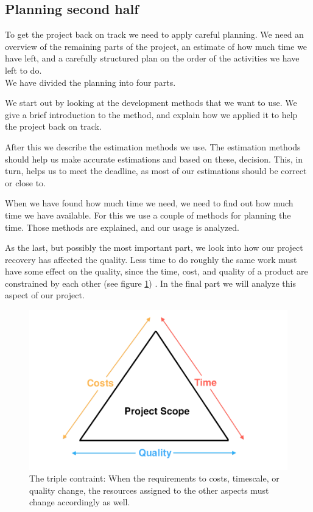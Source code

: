 \subsection{Planning second half}
To get the project back on track we need to apply careful planning. We need an overview of the remaining parts of the project, an estimate of how much time we have left, and a carefully structured plan on the order of the activities we have left to do.\\
We have divided the planning into four parts.

We start out by looking at the development methods that we want to use. We give a brief introduction to the method, and explain how we applied it to help the project back on track.

After this we describe the estimation methods we use. The estimation methods should help us make accurate estimations and based on these, decision. This, in turn, helps us to meet the deadline, as most of our estimations should be correct or close to.

When we have found how much time we need, we need to find out how much time we have available. For this we use a couple of methods for planning the time. Those methods are explained, and our usage is analyzed.

As the last, but possibly the most important part, we look into how our project recovery has affected the quality. Less time to do roughly the same work must have some effect on the quality, since the time, cost, and quality of a product are constrained by each other (see figure \ref{fig:timeCostsQuality}) \cite[p. 191]{PM}. In the final part we will analyze this aspect of our project.

\begin{figure}[H]
  \includegraphics[width=\textwidth]{illustrations/timeCostsQuality}
  \caption{The triple contraint: When the requirements to costs, timescale, or quality change, the resources assigned to the other aspects must change accordingly as well.}
  \label{fig:timeCostsQuality}
\end{figure}